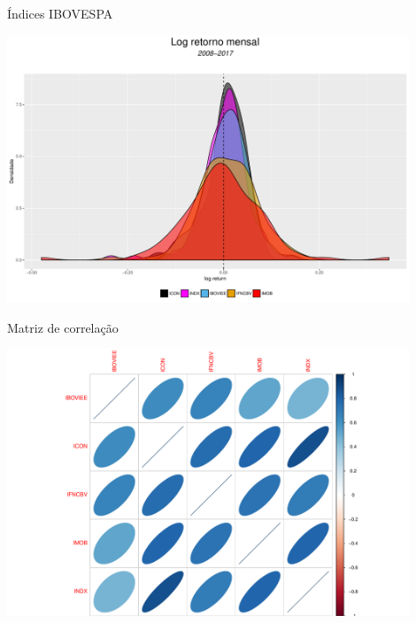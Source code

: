 \documentclass{beamer}
\begin{document}
\begin{frame}{Índices  IBOVESPA}

\begin{center}
 \includegraphics[height=8cm,keepaspectratio]{decritiva_indices.pdf}
 \end{center}


\end{frame}


\begin{frame}{Matriz de correlação}

\begin{center}
 \includegraphics[height=8cm,keepaspectratio]{descritiva_cor.pdf}
 \end{center}


\end{frame}
\end{document}
